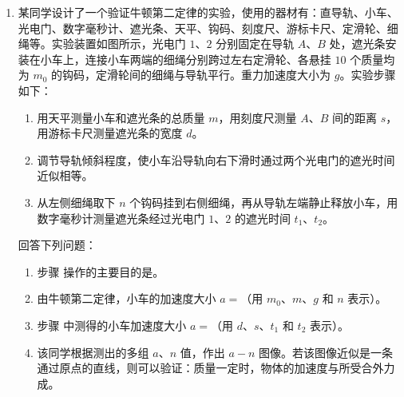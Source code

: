 \documentclass[\gkver]{gaokaozhenti}
\begin{document}
\begin{enumerate}
{（3）根据 $ \rho = \frac{\pi U d^{2}}{4IL} $ 可知 $ U = \frac{4\rho IL}{\pi d^{2}} $，故 $ U-IL $ 图像的斜率为 $ k = \frac{4\rho}{\pi d^{2}} $，得 $ \frac{4\rho}{\pi d^{2}} = \frac{2.3}{70 \times 10^{-3}} $，代入数值解得 $ \rho = 6.4 \times 10^{-6} \UOm $。

（4）干电池的内阻增大，不考虑电表内阻的影响下，实验中测量的 $ U $ 和通过的电流 $ I $ 还是真实值，对实验测量结果无影响。
}
\item
某同学设计了一个验证牛顿第二定律的实验，使用的器材有：直导轨、小车、光电门、数字毫秒计、遮光条、天平、钩码、刻度尺、游标卡尺、定滑轮、细绳等。实验装置如图所示，光电门 $ 1 $、$ 2 $ 分别固定在导轨 $ A $、$ B $ 处，遮光条安装在小车上，连接小车两端的细绳分别跨过左右定滑轮、各悬挂 $ 10 $ 个质量均为 $ m_{0} $ 的钩码，定滑轮间的细绳与导轨平行。重力加速度大小为 $ g $。实验步骤如下：
\onepicture[w=13.18cm, h=5.93cm]{}
\begin{enumerate}[label=\roman*.]
	\item 
	用天平测量小车和遮光条的总质量 $ m $，用刻度尺测量 $ A $、$ B $ 间的距离 $ s $，用游标卡尺测量遮光条的宽度 $ d $。
	\item 
	调节导轨倾斜程度，使小车沿导轨向右下滑时通过两个光电门的遮光时间近似相等。
	\item 
	从左侧细绳取下 $ n $ 个钩码挂到右侧细绳，再从导轨左端静止释放小车，用数字毫秒计测量遮光条经过光电门 $ 1 $、$ 2 $ 的遮光时间 $ t_{1} $、$ t_{2} $。
\end{enumerate}
回答下列问题：
\begin{enumerate}
	\item 
	步骤  操作的主要目的是。
	
	\item
	由牛顿第二定律，小车的加速度大小 $ a =$（用 $ m_{0} $、$ m $、$ g $ 和 $ n $ 表示）。
	
	\item
	步骤  中测得的小车加速度大小 $ a =$（用 $ d $、$ s $、$ t_{1} $ 和 $ t_{2} $ 表示）。
	
	\item
	该同学根据测出的多组 $ a $、$ n $ 值，作出 $ a-n $ 图像。若该图像近似是一条通过原点的直线，则可以验证：质量一定时，物体的加速度与所受合外力成。
	

\end{enumerate}
\end{enumerate}
\end{document}
